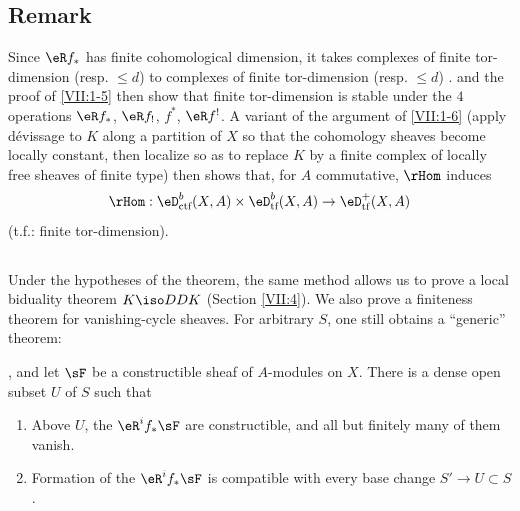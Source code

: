 \subsection{Remark}\label{VII:1-7}

Since $\eR f_\ast$ has finite cohomological dimension, it takes complexes of
finite tor-dimension (resp. $\leqslant d$) to complexes of finite
tor-dimension (resp. $\leqslant d$) .
 and the proof of \ref{VII:1-5} then show that finite
tor-dimension is stable under the $4$ operations $\eR f_\ast$,
$\eR f_!$, $f^\ast$, $\eR f^!$. A variant of the argument of
\ref{VII:1-6} (apply dévissage to $K$ along a partition of $X$ so that the
cohomology sheaves become locally constant, then localize so as to replace $K$
by a finite complex of locally free sheaves of finite type) then shows that,
for $A$ commutative, $\rHom$ induces
\[
  \rHom:\eD_\text{ctf}^b(X,A)\times \eD_\text{tf}^b(X,A) \to \eD_\text{tf}^+(X,A)
\]
(t.f.: finite tor-dimension).






\subsection{}\label{VII:1-8}

Under the hypotheses of the theorem, the same method allows us to prove a
local biduality theorem $K\iso D D K$ (Section \ref{VII:4}). We also prove a
finiteness theorem for vanishing-cycle sheaves. For arbitrary $S$, one still
obtains a ``generic'' theorem:






\begin{theorem_}\label{VII:1-9}
, and let $\sF$ be
a constructible sheaf of $A$-modules on $X$. There is a dense open subset
$U$ of $S$ such that
\begin{enumerate}[\indent (i)]
  \item Above $U$, the $\eR^i f_\ast \sF$ are constructible, and all but
    finitely many of them vanish.
  \item Formation of the $\eR^i f_\ast \sF$ is compatible with every base
    change $S' \to U\subset S$.
\end{enumerate}
\end{theorem_}

